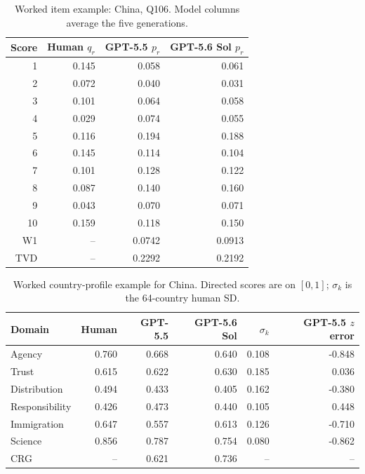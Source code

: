 \begin{table}[!htbp]
\centering
\caption{Worked item example: China, Q106. Model columns average the five generations.}
\label{tab:tutorial-q106}
\small
\begin{tabular}{rrrr}
\toprule
\rowcolor{tablehead} Score & Human $q_r$ & GPT-5.5 $p_r$ & GPT-5.6 Sol $p_r$ \\
\midrule
1 & 0.145 & 0.058 & 0.061 \\
2 & 0.072 & 0.040 & 0.031 \\
3 & 0.101 & 0.064 & 0.058 \\
4 & 0.029 & 0.074 & 0.055 \\
5 & 0.116 & 0.194 & 0.188 \\
6 & 0.145 & 0.114 & 0.104 \\
7 & 0.101 & 0.128 & 0.122 \\
8 & 0.087 & 0.140 & 0.160 \\
9 & 0.043 & 0.070 & 0.071 \\
10 & 0.159 & 0.118 & 0.150 \\
\midrule
W1 & -- & 0.0742 & 0.0913 \\
TVD & -- & 0.2292 & 0.2192 \\
\bottomrule
\end{tabular}
\end{table}
\begin{table}[!htbp]
\centering
\caption{Worked country-profile example for China. Directed scores are on $[0,1]$; $\sigma_k$ is the 64-country human SD.}
\label{tab:tutorial-crg}
\small
\begin{tabular}{lrrrrr}
\toprule
\rowcolor{tablehead} Domain & Human & GPT-5.5 & GPT-5.6 Sol & $\sigma_k$ & GPT-5.5 $z$ error \\
\midrule
Agency & 0.760 & 0.668 & 0.640 & 0.108 & -0.848 \\
Trust & 0.615 & 0.622 & 0.630 & 0.185 & 0.036 \\
Distribution & 0.494 & 0.433 & 0.405 & 0.162 & -0.380 \\
Responsibility & 0.426 & 0.473 & 0.440 & 0.105 & 0.448 \\
Immigration & 0.647 & 0.557 & 0.613 & 0.126 & -0.710 \\
Science & 0.856 & 0.787 & 0.754 & 0.080 & -0.862 \\
\midrule
CRG & -- & 0.621 & 0.736 & -- & -- \\
\bottomrule
\end{tabular}
\end{table}
